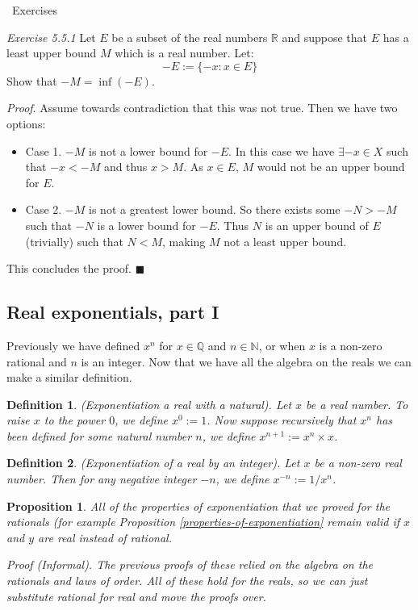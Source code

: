 \documentclass{article}
\newtheorem{definition}{Definition}[subsection]
\newtheorem{proposition}{Proposition}[subsection]
\newcommand{\R}{\mathbb{R}}
\newcommand{\Q}{\mathbb{Q}}
\newcommand{\N}{\mathbb{N}}
\newcommand{\exercisesline}{	%
    \begin{center}
    \textemdash\ Exercises\ \textemdash
    \end{center}
}
\let\it\textit
\begin{document}
\exercisesline

\it{Exercise 5.5.1} Let $E$ be a subset of 
the real numbers $\R$ and suppose that 
$E$ has a least upper bound $M$ which 
is a real number. Let:
$$
-E := \{-x : x \in E\}
$$
Show that $-M = \inf(-E)$. 

\it{Proof}. Assume towards contradiction 
that this was not true. Then we have 
two options:
\begin{itemize}
	\item Case 1. $-M$ is not a lower bound for 
	$-E$. In this case we have 
	$\exists -x \in X$ such 
	that $-x < -M$ and thus $x > M$.
	As $x \in E$, $M$ would not be 
	an upper bound for $E$. 
	\item Case 2. $-M$ is not a greatest 
		lower bound. So there exists 
		some $-N > -M$ such that 
		$-N$ is a lower bound for $-E$.
		Thus $N$ is an upper bound of $E$ 
		(trivially) 
		such that $N < M$, making 
		$M$ not a least upper bound.
\end{itemize}
This concludes the proof. \hfil $\blacksquare$


\subsection{Real exponentials, part I}

Previously we have defined $x^n$ for 
$x \in \Q$ and $n \in \N$, or 
when $x$ is a non-zero rational and 
$n$ is an integer. Now that 
we have all the algebra on the reals 
we can make a similar definition. 

\begin{definition}
	(Exponentiation a real with a natural). Let 
	$x$ be a real number. To raise $x$ to the 
	power $0$, we define $x^0:=1$. Now 
	suppose recursively that $x^n$ 
	has been defined for some
	natural number $n$, we 
	define $x^{n+1} := x^n \times x$. 
\end{definition}

\begin{definition}
	(Exponentiation of a real by an integer).
	Let $x$ be a non-zero real number. Then for 
	any negative integer  $-n$, we 
	define $x^{-n} := 1/x^n$.
\end{definition}

\begin{proposition}
	All of the properties of exponentiation 
	that we proved for the rationals 
	(for example Proposition \ref{properties-of-exponentiation}
	remain valid if $x$ and $y$ are real instead of 
	rational.

	\it{Proof} (Informal). The previous proofs 
	of these relied on the algebra on the
	rationals and laws of order. All of 
	these hold for the reals, so we
	can just substitute rational for 
	real and move the proofs over.
\end{proposition}
\end{document}
